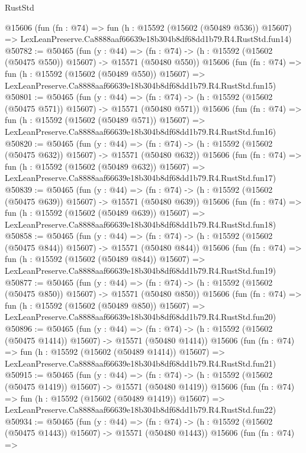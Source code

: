 \begin{lexlean}{RustStd}
\begin{coremodule}
    @15606
    (fun (fn : @74) =>
    fun (h : @15592 (@15602 (@50489 @536)) @15607) =>
    LexLeanPreserve.Ca8888aaf66639e18b304b8df68dd1b79.R4.RustStd.fun14)
@50782 := @50465
    (fun (y : @44) =>
    (fn : @74) -> (h : @15592 (@15602 (@50475 @550)) @15607) -> @15571 (@50480 @550))
    @15606
    (fun (fn : @74) =>
    fun (h : @15592 (@15602 (@50489 @550)) @15607) =>
    LexLeanPreserve.Ca8888aaf66639e18b304b8df68dd1b79.R4.RustStd.fun15)
@50801 := @50465
    (fun (y : @44) =>
    (fn : @74) -> (h : @15592 (@15602 (@50475 @571)) @15607) -> @15571 (@50480 @571))
    @15606
    (fun (fn : @74) =>
    fun (h : @15592 (@15602 (@50489 @571)) @15607) =>
    LexLeanPreserve.Ca8888aaf66639e18b304b8df68dd1b79.R4.RustStd.fun16)
@50820 := @50465
    (fun (y : @44) =>
    (fn : @74) -> (h : @15592 (@15602 (@50475 @632)) @15607) -> @15571 (@50480 @632))
    @15606
    (fun (fn : @74) =>
    fun (h : @15592 (@15602 (@50489 @632)) @15607) =>
    LexLeanPreserve.Ca8888aaf66639e18b304b8df68dd1b79.R4.RustStd.fun17)
@50839 := @50465
    (fun (y : @44) =>
    (fn : @74) -> (h : @15592 (@15602 (@50475 @639)) @15607) -> @15571 (@50480 @639))
    @15606
    (fun (fn : @74) =>
    fun (h : @15592 (@15602 (@50489 @639)) @15607) =>
    LexLeanPreserve.Ca8888aaf66639e18b304b8df68dd1b79.R4.RustStd.fun18)
@50858 := @50465
    (fun (y : @44) =>
    (fn : @74) -> (h : @15592 (@15602 (@50475 @844)) @15607) -> @15571 (@50480 @844))
    @15606
    (fun (fn : @74) =>
    fun (h : @15592 (@15602 (@50489 @844)) @15607) =>
    LexLeanPreserve.Ca8888aaf66639e18b304b8df68dd1b79.R4.RustStd.fun19)
@50877 := @50465
    (fun (y : @44) =>
    (fn : @74) -> (h : @15592 (@15602 (@50475 @850)) @15607) -> @15571 (@50480 @850))
    @15606
    (fun (fn : @74) =>
    fun (h : @15592 (@15602 (@50489 @850)) @15607) =>
    LexLeanPreserve.Ca8888aaf66639e18b304b8df68dd1b79.R4.RustStd.fun20)
@50896 := @50465
    (fun (y : @44) =>
    (fn : @74) -> (h : @15592 (@15602 (@50475 @1414)) @15607) -> @15571 (@50480 @1414))
    @15606
    (fun (fn : @74) =>
    fun (h : @15592 (@15602 (@50489 @1414)) @15607) =>
    LexLeanPreserve.Ca8888aaf66639e18b304b8df68dd1b79.R4.RustStd.fun21)
@50915 := @50465
    (fun (y : @44) =>
    (fn : @74) -> (h : @15592 (@15602 (@50475 @1419)) @15607) -> @15571 (@50480 @1419))
    @15606
    (fun (fn : @74) =>
    fun (h : @15592 (@15602 (@50489 @1419)) @15607) =>
    LexLeanPreserve.Ca8888aaf66639e18b304b8df68dd1b79.R4.RustStd.fun22)
@50934 := @50465
    (fun (y : @44) =>
    (fn : @74) -> (h : @15592 (@15602 (@50475 @1443)) @15607) -> @15571 (@50480 @1443))
    @15606
    (fun (fn : @74) =>

\end{coremodule}
\end{lexlean}
